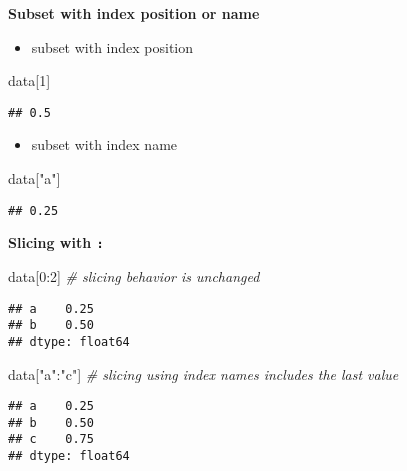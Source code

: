 \documentclass[
]{book}
\newenvironment{Shaded}{\begin{snugshade}}{\end{snugshade}}
\newcommand{\CommentTok}[1]{\textcolor[rgb]{0.56,0.35,0.01}{\textit{#1}}}
\newcommand{\DecValTok}[1]{\textcolor[rgb]{0.00,0.00,0.81}{#1}}
\newcommand{\NormalTok}[1]{#1}
\newcommand{\StringTok}[1]{\textcolor[rgb]{0.31,0.60,0.02}{#1}}
\providecommand{\tightlist}{%
  \setlength{\itemsep}{0pt}\setlength{\parskip}{0pt}}
\begin{document}
\textbf{Subset with index position or name}

\begin{itemize}
\tightlist
\item
  subset with index position
\end{itemize}

\begin{Shaded}
\begin{Highlighting}[]
\NormalTok{data[}\DecValTok{1}\NormalTok{]}
\end{Highlighting}
\end{Shaded}

\begin{verbatim}
## 0.5
\end{verbatim}

\begin{itemize}
\tightlist
\item
  subset with index name
\end{itemize}

\begin{Shaded}
\begin{Highlighting}[]
\NormalTok{data[}\StringTok{"a"}\NormalTok{]}
\end{Highlighting}
\end{Shaded}

\begin{verbatim}
## 0.25
\end{verbatim}

\textbf{Slicing with \texttt{:}}

\begin{Shaded}
\begin{Highlighting}[]
\NormalTok{data[}\DecValTok{0}\NormalTok{:}\DecValTok{2}\NormalTok{] }\CommentTok{\# slicing behavior is unchanged}
\end{Highlighting}
\end{Shaded}

\begin{verbatim}
## a    0.25
## b    0.50
## dtype: float64
\end{verbatim}

\begin{Shaded}
\begin{Highlighting}[]
\NormalTok{data[}\StringTok{"a"}\NormalTok{:}\StringTok{"c"}\NormalTok{] }\CommentTok{\# slicing using index names includes the last value}
\end{Highlighting}
\end{Shaded}

\begin{verbatim}
## a    0.25
## b    0.50
## c    0.75
## dtype: float64
\end{verbatim}
\end{document}
